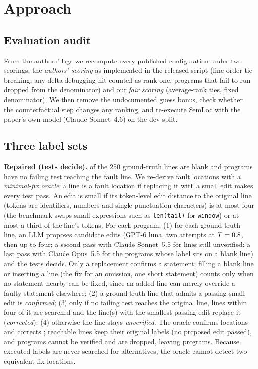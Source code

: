 \section{Approach}
\label{sec:approach}

\subsection{Evaluation audit}
From the authors' logs we recompute every published configuration under two scorings: the \emph{authors' scoring} as
implemented in the released script (line-order tie breaking, any delta-debugging hit counted as rank one, programs that
fail to run dropped from the denominator) and our \emph{fair scoring} (average-rank ties, fixed denominator). We then
remove the undocumented guess bonus, check whether the counterfactual step changes any ranking, and re-execute SemLoc
with the paper's own model (Claude Sonnet~4.6) on the dev split.

\subsection{Three label sets}

\textbf{Repaired (tests decide).}
\GtBlankN{} of the 250 ground-truth lines are blank and \GtNotExecutedN{} programs have no failing test reaching the
fault line. We re-derive fault locations with a \emph{minimal-fix oracle}: a line is a fault location if replacing it
with a small edit makes every test pass. An edit is small if its token-level edit
distance to the original line (tokens are identifiers, numbers and single punctuation characters) is at most four
(the benchmark swaps small expressions such as \texttt{len(tail)} for \texttt{window}) or at most a third of the line's
tokens. For each program: (1) for each ground-truth line, an LLM proposes candidate edits
(GPT-6 luna, two attempts at $T=0.8$, then up to four; a second pass with Claude Sonnet~5.5 for lines still
unverified; a last pass with Claude Opus~5.5 for the programs whose label sits on a blank line) and the tests
decide. Only a replacement confirms a statement; filling a blank line or inserting a line (the fix for an omission, one
short statement) counts only when no statement nearby can be fixed, since an added line can merely override a faulty
statement elsewhere; (2) a ground-truth line that admits a passing small edit is \emph{confirmed};
(3) only if no failing test reaches the original line, lines within four of it are searched and the line(s) with
the smallest passing edit replace it (\emph{corrected}); (4) otherwise the line stays \emph{unverified}. The oracle
confirms \GtConfirmedN{} locations and corrects \GtCorrectedN; \GtUnverifiedN{} reachable lines keep their original labels
(no proposed edit passed), and \GtUnverifiableN{} programs cannot be verified and are dropped, leaving \GtRepairedN{}
programs. Because executed labels are never
searched for alternatives, the oracle cannot detect two equivalent fix locations.

